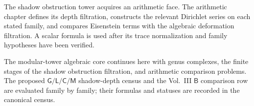 \documentclass[11pt]{memoir}
\begin{document}
%
%
%


\noindent
The shadow obstruction tower acquires an arithmetic face.
The arithmetic chapter defines its depth filtration, constructs the
relevant Dirichlet series on each stated family, and compares
Eisenstein terms with the algebraic deformation filtration.  A scalar
formula is used after its trace normalization and family hypotheses
have been verified.



\ifannalsedition\else

\noindent
The modular-tower algebraic core continues here with genus complexes,
the finite stages of the shadow obstruction filtration, and
arithmetic comparison problems.  The proposed
$\mathsf G/\mathsf L/\mathsf C/\mathsf M$ shadow-depth census and the
Vol.~III $\mathsf B$ comparison row are evaluated family by family;
their formulas and statuses are recorded in the canonical census.





\clearpage

\end{document}

